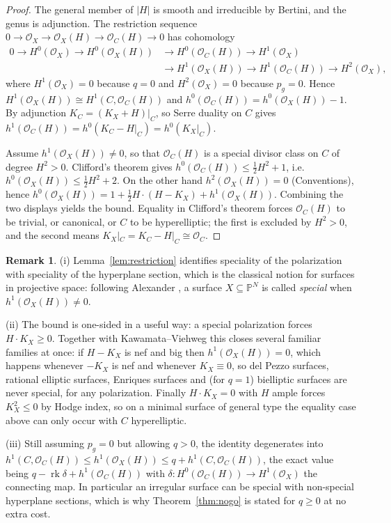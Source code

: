 \documentclass{amsart}
\theoremstyle{definition}
\newtheorem{remark}[theorem]{Remark}
\newcommand{\OO}{\mathcal{O}}
\newcommand{\PP}{\mathbb{P}}
\begin{document}
\begin{proof}
The general member of $|H|$ is smooth and irreducible by Bertini, and the genus is adjunction. The restriction sequence $0\to\OO_X\to\OO_X(H)\to\OO_C(H)\to0$ has cohomology
\[
\begin{aligned}
0\to H^0(\OO_X)\to H^0(\OO_X(H))&\to H^0(\OO_C(H))\to H^1(\OO_X)\\
&\to H^1(\OO_X(H))\to H^1(\OO_C(H))\to H^2(\OO_X),
\end{aligned}
\]
where $H^1(\OO_X)=0$ because $q=0$ and $H^2(\OO_X)=0$ because $p_g=0$. Hence $H^1(\OO_X(H))\cong H^1(C,\OO_C(H))$ and $h^0(\OO_C(H))=h^0(\OO_X(H))-1$. By adjunction $K_C=(K_X+H)|_C$, so Serre duality on $C$ gives $h^1(\OO_C(H))=h^0(K_C-H|_C)=h^0(K_X|_C)$.

Assume $h^1(\OO_X(H))\neq0$, so that $\OO_C(H)$ is a special divisor class on $C$ of degree $H^2>0$. Clifford's theorem gives $h^0(\OO_C(H))\le\tfrac12H^2+1$, i.e.\ $h^0(\OO_X(H))\le\tfrac12H^2+2$. On the other hand $h^2(\OO_X(H))=0$ (Conventions), hence $h^0(\OO_X(H))=1+\tfrac12H\cdot(H-K_X)+h^1(\OO_X(H))$. Combining the two displays yields the bound. Equality in Clifford's theorem forces $\OO_C(H)$ to be trivial, or canonical, or $C$ to be hyperelliptic; the first is excluded by $H^2>0$, and the second means $K_X|_C=K_C-H|_C\cong\OO_C$.
\end{proof}

\begin{remark}\label{rem:restriction}
(i) Lemma~\ref{lem:restriction} identifies speciality of the polarization with speciality of the hyperplane section, which is the classical notion for surfaces in projective space: following Alexander \cite{Al88,Al92}, a surface $X\subseteq\PP^N$ is called \emph{special} when $h^1(\OO_X(H))\neq0$.

(ii) The bound is one-sided in a useful way: a special polarization forces $H\cdot K_X\ge0$. Together with Kawamata--Viehweg this closes several familiar families at once: if $H-K_X$ is nef and big then $h^1(\OO_X(H))=0$, which happens whenever $-K_X$ is nef and whenever $K_X\equiv0$, so del Pezzo surfaces, rational elliptic surfaces, Enriques surfaces and (for $q=1$) bielliptic surfaces are never special, for any polarization. Finally $H\cdot K_X=0$ with $H$ ample forces $K_X^2\le0$ by Hodge index, so on a minimal surface of general type the equality case above can only occur with $C$ hyperelliptic.

(iii) Still assuming $p_g=0$ but allowing $q>0$, the identity degenerates into $h^1(C,\OO_C(H))\le h^1(\OO_X(H))\le q+h^1(C,\OO_C(H))$, the exact value being $q-\operatorname{rk}\delta+h^1(\OO_C(H))$ with $\delta:H^0(\OO_C(H))\to H^1(\OO_X)$ the connecting map. In particular an irregular surface can be special with non-special hyperplane sections, which is why Theorem~\ref{thm:nogo} is stated for $q\ge0$ at no extra cost.
\end{remark}
\end{document}
